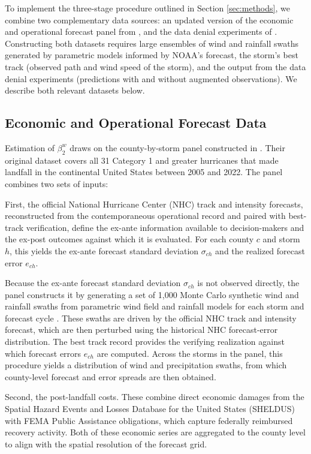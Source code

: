 \documentclass[12pt]{article}%
\begin{document}
To implement the three-stage procedure outlined in Section \ref{sec:methods}, we combine two complementary data sources: an updated version of the economic and operational forecast panel from \citet{molina2024social}, and the data denial experiments of \citet{DitchekEA2023}. Constructing both datasets requires large ensembles of wind and rainfall swaths generated by parametric models informed by NOAA's forecast, the storm's best track (observed path and wind speed of the storm), and the output from the data denial experiments (predictions with and without augmented observations). We describe both relevant datasets below.

\subsection{Economic and Operational Forecast Data}

Estimation of $\beta^{w}_{2}$ draws on the county-by-storm panel constructed in \citet{molina2024social}. Their original dataset covers all 31 Category 1 and greater hurricanes that made landfall in the continental United States between 2005 and 2022. The panel combines two sets of inputs:

First, the official National Hurricane Center (NHC) track and intensity forecasts, reconstructed from the contemporaneous operational record and paired with best-track verification, define the ex-ante information available to decision-makers and the ex-post outcomes against which it is evaluated. For each county $c$ and storm $h$, this yields the ex-ante forecast standard deviation $\sigma_{ch}$ and the realized forecast error $e_{ch}$.

Because the ex-ante forecast standard deviation $\sigma_{ch}$ is not observed directly, the panel constructs it by generating a set of 1,000 Monte Carlo synthetic wind and rainfall swaths from parametric wind field and rainfall models for each storm and forecast cycle \citep{lonfat2007parametric, willoughby2006parametric, knaff2007statistical}. These swaths are driven by the official NHC track and intensity forecast, which are then perturbed using the historical NHC forecast-error distribution. The best track record provides the verifying realization against which forecast errors $e_{ch}$ are computed. Across the storms in the panel, this procedure yields a distribution of wind and precipitation swaths, from which county-level forecast and error spreads are then obtained.

Second, the post-landfall costs. These combine direct economic damages from the Spatial Hazard Events and Losses Database for the United States (SHELDUS) with FEMA Public Assistance obligations, which capture federally reimbursed recovery activity. Both of these economic series are aggregated to the county level to align with the spatial resolution of the forecast grid.
\end{document}
